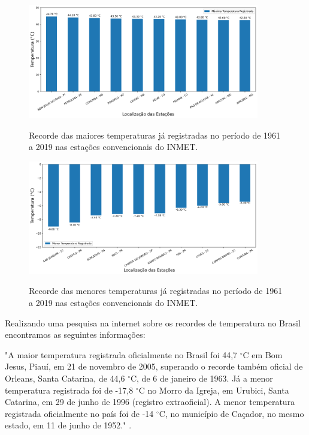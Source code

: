 \begin{figure}[H]
    \centering
    \caption{Recorde das maiores temperaturas já registradas no período de 1961 a 2019 nas estações convencionais do INMET.}
    \includegraphics[width=0.9\textwidth]{figuras/estacoes_convencionais_maiores_temperaturas.png}
    \label{fig:estacoes_convencionais_maiores_temperaturas}
\end{figure}

\begin{figure}[H]
    \centering
    \caption{Recorde das menores temperaturas já registradas no período de 1961 a 2019 nas estações convencionais do INMET.}
    \includegraphics[width=0.9\textwidth]{figuras/estacoes_convencionais_menores_temperaturas.png}
    \label{fig:estacoes_convencionais_menores_temperaturas}
\end{figure}

Realizando uma pesquisa na internet sobre os recordes de temperatura no Brasil encontramos as seguintes informações: 

\begin{displayquote}
"A maior temperatura registrada oficialmente no Brasil foi 44,7 $^{\circ}$C em Bom Jesus, Piauí, em 21 de novembro de 2005, superando o recorde também oficial de Orleans, Santa Catarina, de 44,6 $^{\circ}$C, de 6 de janeiro de 1963. Já a menor temperatura registrada foi de -17,8 $^{\circ}$C no Morro da Igreja, em Urubici, Santa Catarina, em 29 de junho de 1996 (registro extraoficial). A menor temperatura registrada oficialmente no país foi de -14 $^{\circ}$C, no município de Caçador, no mesmo estado, em 11 de junho de 1952." \cite{wiki:clima_do_brasil}.
\end{displayquote}


